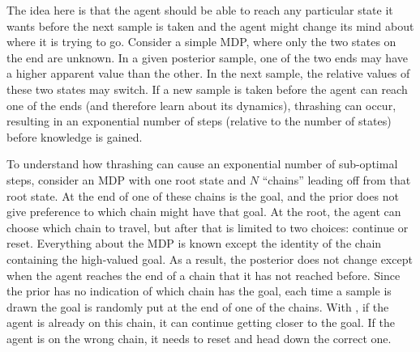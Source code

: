 The idea here is that the agent should be able to reach any particular state it wants before the next sample is taken and the agent might change its mind about where it is trying to go. Consider a simple  MDP, where only the two states on the end are unknown. In a given posterior sample, one of the two ends may have a higher apparent value than the other. In the next sample, the relative values of these two states may switch. If a new sample is taken before the agent can reach one of the ends (and therefore learn about its dynamics), thrashing can occur, resulting in an exponential number of steps (relative to the number of states) before knowledge is gained.

To understand how thrashing can cause an exponential number of sub-optimal steps, consider an MDP with one root state and $N$ ``chains'' leading off from that root state. At the end of one of these chains is the goal, and the prior does not give preference to which chain might have that goal. At the root, the agent can choose which chain to travel, but after that is limited to two choices: continue or reset. Everything about the MDP is known except the identity of the chain containing the high-valued goal. As a result, the posterior does not change except when the agent reaches the end of a chain that it has not reached before. Since the prior has no indication of which chain has the goal, each time a sample is drawn the goal is randomly put at the end of one of the chains. With , if the agent is already on this chain, it can continue getting closer to the goal. If the agent is on the wrong chain, it needs to reset and head down the correct one. 

